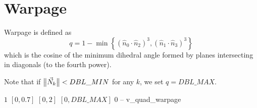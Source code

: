 \section{Warpage}

Warpage is defined as
\[
q =
  1 - \min \left\{
    \left( \hat n_0 \cdot \hat n_2  \right)^3,
    \left( \hat n_1 \cdot \hat n_3  \right)^3
  \right\}
\]
which is the cosine of the minimum dihedral angle formed by
planes intersecting in diagonals (to the fourth power).

Note that if $\big\lVert{\vec N_k}\big\rVert < DBL\_MIN$ for any $k$, we set $q = DBL\_MAX$.

%
{$1$}%
{$[0,0.7]$}%
{$[0,2]$}%
{$[0,DBL\_MAX]$}%
{$0$}%
{--}%
{v\_quad\_warpage}%


